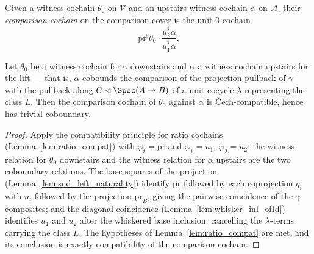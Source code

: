\begin{definition}
  \label{def:comparisonCochain}
  \leanok
  Given a witness cochain \(\theta_0\) on \(\mathcal V\) and an upstairs witness cochain
  \(\alpha\) on \(\mathcal A\), their \emph{comparison cochain} on the comparison cover is the
  unit \(0\)-cochain
  \[
    \mathrm{pr}^{\sharp}\theta_0 \cdot
      \frac{u_2^{\sharp}\alpha}{u_1^{\sharp}\alpha} .
  \]
\end{definition}

\begin{theorem}
  \label{thm:comparisonCochain_compat}
  \leanok
  Let \(\theta_0\) be a witness cochain for \(\gamma\) downstairs and \(\alpha\) a witness
  cochain upstairs for the lift — that is, \(\alpha\) cobounds the comparison of the projection
  pullback of \(\gamma\) with the pullback along \(C \lhd \Spec(A \to B)\) of a unit cocycle
  \(\lambda\) representing the class \(L\). Then the comparison cochain of \(\theta_0\) against
  \(\alpha\) is \v Cech-compatible, hence has trivial coboundary.
\end{theorem}
\begin{proof}
  \leanok
  Apply the compatibility principle for ratio cochains (Lemma~\ref{lem:ratio_compat}) with
  \(\varphi_t = \mathrm{pr}\) and \(\varphi_1 = u_1\), \(\varphi_2 = u_2\): the witness relation
  for \(\theta_0\) downstairs and the witness relation for \(\alpha\) upstairs are the two
  coboundary relations. The base squares of the projection
  (Lemma~\ref{lem:snd_left_naturality}) identify \(\mathrm{pr}\) followed by each coprojection
  \(q_i\) with \(u_i\) followed by the projection \(\mathrm{pr}_B\), giving the pairwise
  coincidence of the \(\gamma\)-composites; and the diagonal coincidence
  (Lemma~\ref{lem:whisker_inl_ofId}) identifies \(u_1\) and \(u_2\) after the whiskered base
  inclusion, cancelling the \(\lambda\)-terms carrying the class \(L\). The hypotheses of
  Lemma~\ref{lem:ratio_compat} are met, and its conclusion is exactly compatibility of the
  comparison cochain.
\end{proof}

